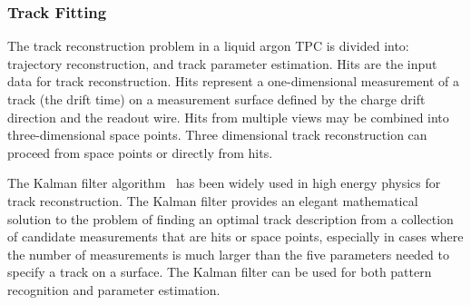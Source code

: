 \subsubsection{Track Fitting}


The track reconstruction problem in a liquid argon TPC is divided
into: trajectory reconstruction, and track parameter estimation.
Hits are the input data for track reconstruction. Hits represent a
one-dimensional measurement of a track (the drift time) on a
measurement surface defined by the charge drift direction and the
readout wire. Hits from multiple views may be combined into
three-dimensional space points. Three dimensional track reconstruction
can proceed from space points or directly from hits.

The Kalman filter algorithm~\cite{kalman} has been widely used in high
energy physics for track reconstruction. The Kalman filter provides an
elegant mathematical solution to the problem of finding an optimal
track description from a collection of candidate measurements that are
hits or space points, especially in cases where the number of
measurements is much larger than the five parameters needed to specify
a track on a surface.  The Kalman filter can be used for both pattern
recognition and parameter estimation.





